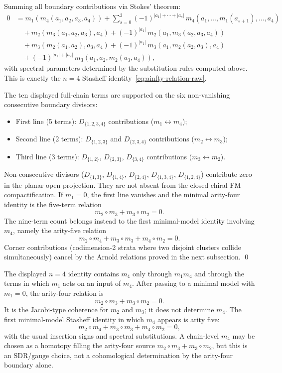 \begin{proposition}[$k=4$ Stasheff identity]
\label{prop:k4_identity}
Summing all boundary contributions via Stokes' theorem:
\begin{align*}
0 &= m_1(m_4(a_1,a_2,a_3,a_4)) + \sum_{s=0}^{3} (-1)^{|a_1|+\cdots+|a_s|}\, m_4(a_1,\ldots,m_1(a_{s+1}),\ldots,a_4) \\
&\quad + m_2(m_3(a_1,a_2,a_3),a_4) + (-1)^{|a_1|}\, m_2(a_1,m_3(a_2,a_3,a_4)) \\
&\quad + m_3(m_2(a_1,a_2),a_3,a_4) + (-1)^{|a_1|}\, m_3(a_1,m_2(a_2,a_3),a_4) \\
&\quad + (-1)^{|a_1|+|a_2|}\, m_3(a_1,a_2,m_2(a_3,a_4)),
\end{align*}
with spectral parameters determined by the substitution rules computed above. This is exactly the $n=4$ Stasheff identity~\eqref{eq:ainfty-relation-raw}.

The ten displayed full-chain terms are supported on the six
non-vanishing consecutive boundary divisors:
\begin{itemize}
\item First line (5 terms): $D_{\{1,2,3,4\}}$ contributions ($m_1 \leftrightarrow m_4$);
\item Second line (2 terms): $D_{\{1,2,3\}}$ and $D_{\{2,3,4\}}$ contributions ($m_2 \leftrightarrow m_3$);
\item Third line (3 terms): $D_{\{1,2\}}$, $D_{\{2,3\}}$, $D_{\{3,4\}}$ contributions ($m_3 \leftrightarrow m_2$).
\end{itemize}
Non-consecutive divisors
(\(D_{\{1,3\}}\), \(D_{\{1,4\}}\), \(D_{\{2,4\}}\),
\(D_{\{1,3,4\}}\), \(D_{\{1,2,4\}}\)) contribute zero in the planar
open projection. They are not absent from the closed chiral FM
compactification. If \(m_1=0\), the first line vanishes and the
minimal arity-four identity is the five-term relation
\[
m_2\circ m_3+m_3\circ m_2=0.
\]
The nine-term count belongs instead to the first minimal-model
identity involving \(m_4\), namely the arity-five relation
\[
m_2\circ m_4+m_3\circ m_3+m_4\circ m_2=0.
\]
Corner contributions (codimension-2 strata where two disjoint clusters
collide simultaneously) cancel by the Arnold relations proved in the
next subsection. \qed
\end{proposition}

\begin{remark}
\label{rem:arity-four-not-m4}
The displayed \(n=4\) identity contains \(m_4\) only through
\(m_1m_4\) and through the terms in which \(m_1\) acts on an input of
\(m_4\). After passing to a minimal model with \(m_1=0\), the
arity-four relation is
\[
m_2\circ m_3+m_3\circ m_2=0.
\]
It is the Jacobi-type coherence for \(m_2\) and \(m_3\); it does not
determine \(m_4\). The first minimal-model Stasheff identity in which
\(m_4\) appears is arity five:
\[
m_2\circ m_4+m_3\circ m_3+m_4\circ m_2=0,
\]
with the usual insertion signs and spectral substitutions. A
chain-level \(m_4\) may be chosen as a homotopy filling the arity-four
source \(m_2\circ m_3+m_3\circ m_2\), but this is an SDR/gauge choice,
not a cohomological determination by the arity-four boundary alone.
\end{remark}

